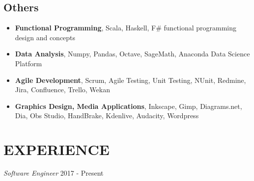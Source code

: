 \documentclass[line,margin]{res}
\begin{document}
\begin{resume}
                 \subsection{Others}
                 \begin{itemize}  \itemsep -2pt %
                   \item \textbf{Functional Programming}, Scala, Haskell, F\# functional programming design and concepts 
                   \item \textbf{Data Analysis}, Numpy, Pandas, Octave, SageMath, Anaconda Data Science Platform 
                   \item \textbf{Agile Development},  Scrum, Agile Testing, Unit Testing, NUnit, Redmine, Jira, Confluence, Trello, Wekan
                   \item \textbf{Graphics Design, Media Applications}, Inkscape, Gimp, Diagrams.net, Dia, Obs Studio, HandBrake, Kdenlive, Audacity, Wordpress
                 \end{itemize}
 
\noindent\hrulefill
\section{EXPERIENCE} {\sl Software Engineer} \hfill  2017 - Present \\
                 \begin{itemize}  \itemsep -2pt %
               

\end{itemize}
\end{resume}
\end{document}
